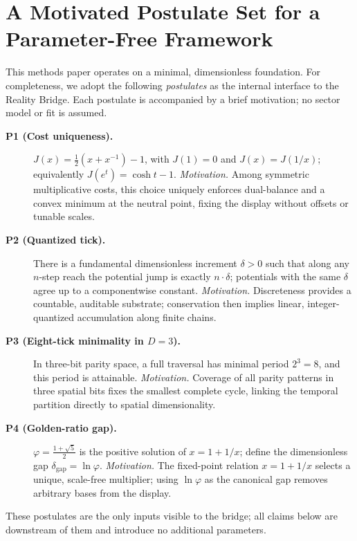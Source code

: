 \documentclass[11pt]{article}
\begin{document}
\section{A Motivated Postulate Set for a Parameter-Free Framework}
\noindent
This methods paper operates on a minimal, dimensionless foundation. For completeness, we adopt the following \emph{postulates} as the internal interface to the Reality Bridge. Each postulate is accompanied by a brief motivation; no sector model or fit is assumed.

\begin{description}
  \item[\textbf{P1 (Cost uniqueness).}] \(J(x)=\tfrac12(x+x^{-1})-1\), with \(J(1)=0\) and \(J(x)=J(1/x)\); equivalently \(J(e^{t})=\cosh t-1\).
  \emph{Motivation.} Among symmetric multiplicative costs, this choice uniquely enforces dual-balance and a convex minimum at the neutral point, fixing the display without offsets or tunable scales.

  \item[\textbf{P2 (Quantized tick).}] There is a fundamental dimensionless increment \(\delta>0\) such that along any \(n\)-step reach the potential jump is exactly \(n\cdot\delta\); potentials with the same \(\delta\) agree up to a componentwise constant.
  \emph{Motivation.} Discreteness provides a countable, auditable substrate; conservation then implies linear, integer-quantized accumulation along finite chains.

  \item[\textbf{P3 (Eight-tick minimality in \(D=3\)).}] In three-bit parity space, a full traversal has minimal period \(2^{3}=8\), and this period is attainable.
  \emph{Motivation.} Coverage of all parity patterns in three spatial bits fixes the smallest complete cycle, linking the temporal partition directly to spatial dimensionality.

  \item[\textbf{P4 (Golden-ratio gap).}] \(\varphi=\tfrac{1+\sqrt5}{2}\) is the positive solution of \(x=1+1/x\); define the dimensionless gap \(\delta_{\mathrm{gap}}=\ln\varphi\).
  \emph{Motivation.} The fixed-point relation \(x=1+1/x\) selects a unique, scale-free multiplier; using \(\ln\varphi\) as the canonical gap removes arbitrary bases from the display.
\end{description}

\noindent These postulates are the only inputs visible to the bridge; all claims below are downstream of them and introduce no additional parameters.
\end{document}
